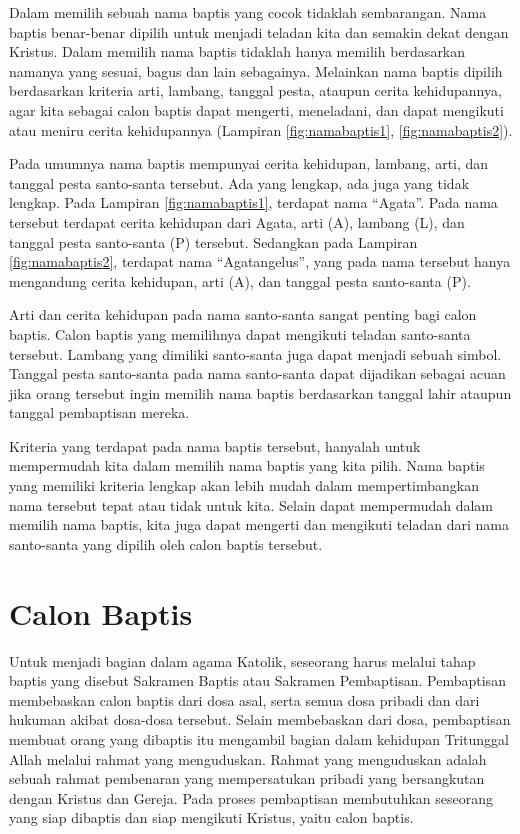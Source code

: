 	
	Dalam memilih sebuah nama baptis yang cocok tidaklah sembarangan. Nama baptis benar-benar dipilih untuk menjadi teladan kita dan semakin dekat dengan Kristus. Dalam memilih nama baptis tidaklah hanya memilih berdasarkan namanya yang sesuai, bagus dan lain sebagainya. Melainkan nama baptis dipilih berdasarkan kriteria arti, lambang, tanggal pesta, ataupun cerita kehidupannya, agar kita sebagai calon baptis dapat mengerti, meneladani, dan dapat mengikuti atau meniru cerita kehidupannya (Lampiran \ref{fig:namabaptis1}, \ref{fig:namabaptis2}).
	
	Pada umumnya nama baptis mempunyai cerita kehidupan, lambang, arti, dan tanggal pesta santo-santa tersebut. Ada yang lengkap, ada juga yang tidak lengkap. Pada Lampiran \ref{fig:namabaptis1}, terdapat nama ``Agata''. Pada nama tersebut terdapat cerita kehidupan dari Agata, arti (A), lambang (L), dan tanggal pesta santo-santa (P) tersebut. Sedangkan pada Lampiran \ref{fig:namabaptis2}, terdapat nama ``Agatangelus'', yang pada nama tersebut hanya mengandung cerita kehidupan, arti (A), dan tanggal pesta santo-santa (P).
	
	Arti dan cerita kehidupan pada nama santo-santa sangat penting bagi calon baptis. Calon baptis yang memilihnya dapat mengikuti teladan santo-santa tersebut. Lambang yang dimiliki santo-santa juga dapat menjadi sebuah simbol. Tanggal pesta santo-santa pada nama santo-santa dapat dijadikan sebagai acuan jika orang tersebut ingin memilih nama baptis berdasarkan tanggal lahir ataupun tanggal pembaptisan mereka.
	
	Kriteria yang terdapat pada nama baptis tersebut, hanyalah untuk mempermudah kita dalam memilih nama baptis yang kita pilih. Nama baptis yang memiliki kriteria lengkap akan lebih mudah dalam mempertimbangkan nama tersebut tepat atau tidak untuk kita. Selain dapat mempermudah dalam memilih nama baptis, kita juga dapat mengerti dan mengikuti teladan dari nama santo-santa yang dipilih oleh calon baptis tersebut.
	
\section{Calon Baptis}
\label{sec:articalonbaptis}
	
	Untuk menjadi bagian dalam agama Katolik, seseorang harus melalui tahap baptis yang disebut Sakramen Baptis atau Sakramen Pembaptisan. Pembaptisan membebaskan calon baptis dari dosa asal, serta semua dosa pribadi dan dari hukuman akibat dosa-dosa tersebut. Selain membebaskan dari dosa, pembaptisan membuat orang yang dibaptis itu mengambil bagian dalam kehidupan Tritunggal Allah melalui rahmat yang menguduskan. Rahmat yang menguduskan adalah sebuah rahmat pembenaran yang mempersatukan pribadi yang bersangkutan dengan Kristus dan Gereja. Pada proses pembaptisan membutuhkan seseorang yang siap dibaptis dan siap mengikuti Kristus, yaitu calon baptis.
	
